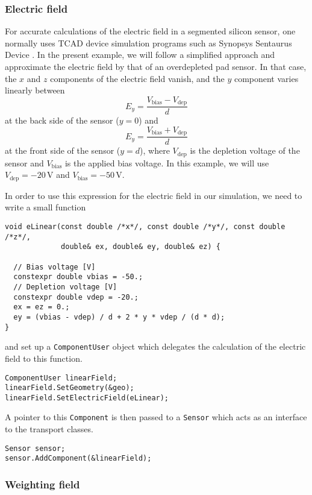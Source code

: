 \subsubsection{Electric field}
For accurate calculations of the electric field in a segmented silicon sensor, 
one normally uses TCAD device simulation programs such as 
Synopsys Sentaurus Device \cite{Synopsys}. 
In the present example, we will follow a simplified approach 
and approximate the electric field by that of an overdepleted pad sensor. 
In that case, the $x$ and $z$ components of the electric field vanish, 
and the $y$ component varies linearly between
\begin{equation*}
E_y = \frac{V_{\text{bias}} - V_{\text{dep}}}{d}
\end{equation*}
at the back side of the sensor ($y = 0$) and
\begin{equation*}
E_y = \frac{V_{\text{bias}} + V_{\text{dep}}}{d}
\end{equation*}
at the front side of the sensor ($y = d$), where 
$V_{\text{dep}}$ is the depletion voltage of the sensor and 
$V_{\text{bias}}$ is the applied bias voltage. 
In this example, we will use $V_{\text{dep}} = -20$\,V and 
$V_{\text{bias}} = -50$\,V.

In order to use this expression for the electric field in our simulation, 
we need to write a small function
\begin{lstlisting}
void eLinear(const double /*x*/, const double /*y*/, const double /*z*/,
             double& ex, double& ey, double& ez) {

  // Bias voltage [V]
  constexpr double vbias = -50.;
  // Depletion voltage [V]
  constexpr double vdep = -20.;
  ex = ez = 0.;
  ey = (vbias - vdep) / d + 2 * y * vdep / (d * d);
}
\end{lstlisting}
and set up a \texttt{ComponentUser} object 
which delegates the calculation of the electric field to this function.
\begin{lstlisting}
ComponentUser linearField;
linearField.SetGeometry(&geo);
linearField.SetElectricField(eLinear);
\end{lstlisting}
A pointer to this \texttt{Component} is then passed to a \texttt{Sensor}
which acts as an interface to the transport classes.
\begin{lstlisting}
Sensor sensor;
sensor.AddComponent(&linearField);
\end{lstlisting}

\subsubsection{Weighting field}

